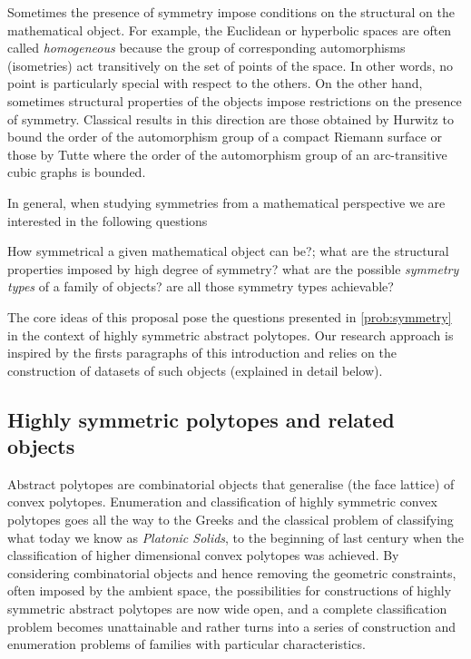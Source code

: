 \documentclass[a4paper,12pt,english]{article}
\begin{document}
Sometimes the presence of symmetry impose conditions on the structural on the mathematical object. For example, the Euclidean or hyperbolic spaces are often called \emph{homogeneous} because the group of corresponding automorphisms (isometries) act transitively on the set of points of the space. In other words, no point is particularly special with respect to the others. 
On the other hand, sometimes structural properties of the objects impose restrictions on the presence of symmetry. Classical results in this direction are those obtained by Hurwitz \cite{Hurwitz1892_UeberAlgebraischeGebilde} to bound the order of the automorphism group of a compact Riemann surface or those by Tutte \cite{Tutte1959_SymmetryCubicGraphs} where the order of the automorphism group of an arc-transitive cubic graphs is bounded.

In general, when studying symmetries from a mathematical perspective we are interested in the following questions

\begin{problem}\label{prob:symmetry}
  How symmetrical a given mathematical object can be?; what are the  structural properties imposed by high degree of symmetry? what are the possible \emph{symmetry types} of a family of objects? are all those symmetry types achievable?
\end{problem}

The core ideas of this proposal pose the questions presented in \cref{prob:symmetry} in the context of highly symmetric abstract polytopes. Our research approach is inspired by the firsts paragraphs of this introduction and relies on the construction of datasets of such objects (explained in detail below).

\subsection*{Highly symmetric polytopes and related objects}

Abstract polytopes are combinatorial objects that generalise (the face lattice) of convex polytopes.
Enumeration and classification of highly symmetric convex polytopes goes all the way to the Greeks and the classical problem of classifying what today we know as \emph{Platonic Solids}, to the beginning of last century when the classification of higher dimensional convex polytopes was achieved.
By considering combinatorial objects and hence removing the geometric constraints, often imposed by the ambient space, the possibilities for constructions of highly symmetric abstract polytopes are now wide open, and a complete classification problem becomes unattainable and rather turns into a series of construction and enumeration problems of families with particular characteristics.
\end{document}
